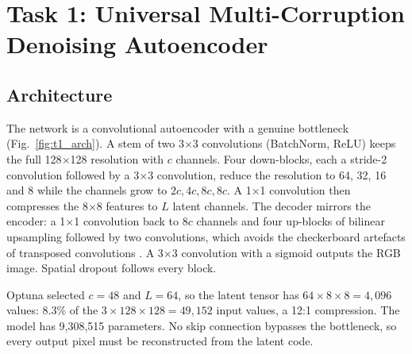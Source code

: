\documentclass[conference]{IEEEtran}
\begin{document}
\section{Task 1: Universal Multi-Corruption Denoising Autoencoder}

\subsection{Architecture}
The network is a convolutional autoencoder with a genuine bottleneck (Fig.~\ref{fig:t1_arch}). A stem of two 3$\times$3 convolutions (BatchNorm, ReLU) keeps the full 128$\times$128 resolution with $c$ channels. Four down-blocks, each a stride-2 convolution followed by a 3$\times$3 convolution, reduce the resolution to 64, 32, 16 and 8 while the channels grow to $2c, 4c, 8c, 8c$. A 1$\times$1 convolution then compresses the 8$\times$8 features to $L$ latent channels. The decoder mirrors the encoder: a 1$\times$1 convolution back to $8c$ channels and four up-blocks of bilinear upsampling followed by two convolutions, which avoids the checkerboard artefacts of transposed convolutions \cite{odena2016}. A 3$\times$3 convolution with a sigmoid outputs the RGB image. Spatial dropout follows every block.

Optuna selected $c = 48$ and $L = 64$, so the latent tensor has $64 \times 8 \times 8 = 4{,}096$ values: 8.3\% of the $3 \times 128 \times 128 = 49{,}152$ input values, a 12:1 compression. The model has 9,308,515 parameters. No skip connection bypasses the bottleneck, so every output pixel must be reconstructed from the latent code.
\end{document}
